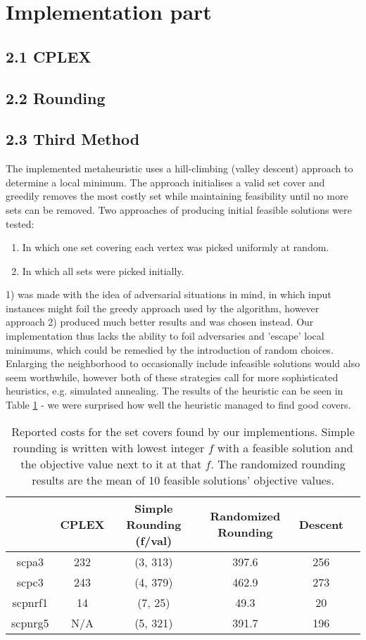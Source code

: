 \documentclass[12pt]{article}
\begin{document}
\pagebreak
\section*{Implementation part}
\subsection*{2.1 CPLEX}

\subsection*{2.2 Rounding}

\subsection*{2.3 Third Method}
The implemented metaheuristic uses a hill-climbing (valley descent) approach to determine a local minimum. The approach initialises a valid set cover and greedily removes the most costly set while maintaining feasibility until no more sets can be removed. Two approaches of producing initial feasible solutions were tested:
\begin{enumerate}
\item In which one set covering each vertex was picked uniformly at random.
\item In which all sets were picked initially.
\end{enumerate}
1) was made with the idea of adversarial situations in mind, in which input instances might foil the greedy approach used by the algorithm, however approach 2) produced much better results and was chosen instead. Our implementation thus lacks the ability to foil adversaries and 'escape' local minimums, which could be remedied by the introduction of random choices. Enlarging the neighborhood to occasionally include infeasible solutions would also seem worthwhile, however both of these strategies call for more sophisticated heuristics, e.g. simulated annealing. The results of the heuristic can be seen in Table \ref{times} - we were surprised how well the heuristic managed to find good covers.
\begin{table}[!hbt]
\center
\begin{tabular}{|c | c | c | c | c | c |}
\hline
& \multicolumn{1}{|c|}{CPLEX} & \multicolumn{1}{|c|}{Simple Rounding (f/val)} & Randomized Rounding & \multicolumn{1}{|c|}{Descent} \\
\hline
scpa3 & 232 & (3, 313) & 397.6 & 256 \\
\hline
scpc3 & 243 & (4, 379) & 462.9 & 273 \\
\hline
scpnrf1 & 14 & (7, 25) & 49.3 & 20 \\
\hline
scpnrg5 & N/A & (5, 321) & 391.7 & 196 \\
\hline 
\end{tabular}
\caption{Reported costs for the set covers found by our implementions. Simple rounding is written with lowest integer $f$ with a feasible solution and the objective value next to it at that $f$. The randomized rounding results are the mean of 10 feasible solutions' objective values.
\label{times}}
\end{table}
\end{document}
